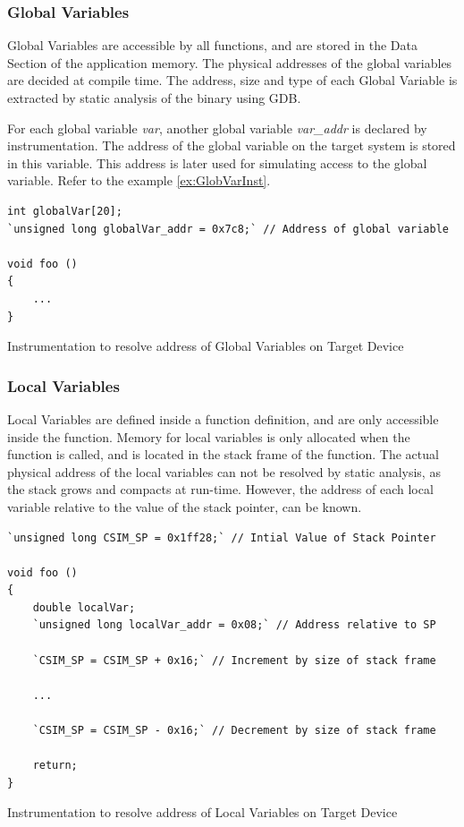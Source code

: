 \subsubsection{Global Variables}
Global Variables are accessible by all functions, and are stored in the Data Section of the application memory. The physical addresses of the global variables are decided at compile time. The address, size and type of each Global Variable is extracted by static analysis of the binary using GDB. 

For each global variable \emph{var}, another global variable \emph{var\_addr} is declared by instrumentation. The address of the global variable on the target system is stored in this variable. This address is later used for simulating access to the global variable. Refer to the example \ref{ex:GlobVarInst}.

\vspace*{10pt}
\begin{Example}
\begin{lstlisting}
int globalVar[20];
`unsigned long globalVar_addr = 0x7c8;` // Address of global variable

void foo ()
{
    ...
}
\end{lstlisting}
\caption{Instrumentation to resolve address of Global Variables on Target Device}
\label{ex:GlobVarInst}
\end{Example}

\subsubsection{Local Variables}
Local Variables are defined inside a function definition, and are only accessible inside the function. Memory for local variables is only allocated when the function is called, and is located in the stack frame of the function. The actual physical address of the local variables can not be resolved by static analysis, as the stack grows and compacts at run-time. However, the address of each local variable relative to the value of the stack pointer, can be known.

\begin{Example}[h]
\begin{lstlisting}[label=lst:LocalVarInst]
`unsigned long CSIM_SP = 0x1ff28;` // Intial Value of Stack Pointer

void foo ()
{
    double localVar;
    `unsigned long localVar_addr = 0x08;` // Address relative to SP

    `CSIM_SP = CSIM_SP + 0x16;` // Increment by size of stack frame
    
    ...
    
    `CSIM_SP = CSIM_SP - 0x16;` // Decrement by size of stack frame
    
    return;
}
\end{lstlisting}
\caption{Instrumentation to resolve address of Local Variables on Target Device}
\label{ex:LocalVarInst}
\end{Example}

